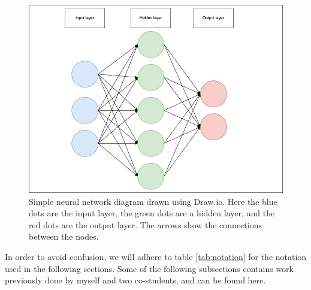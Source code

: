 \begin{figure}[H]
    \includegraphics[width=\linewidth]{Figures/Machinelearning/nn_diagram.jpeg}
    \caption[Simple diagram of a neural network]{Simple neural network diagram drawn using Draw.io. Here the blue dots are the input layer, the green dots are a hidden layer, 
    and the red dots are the output layer. The arrows show the connections between the nodes. }
    \label{fig:nndiagram}
\end{figure}

In order to avoid confusion, we will adhere to table \ref{tab:notation} for the notation used in the following sections.
Some of the following subsections contains work previously done by myself and two co-students, and can be found here\cite{FYSSTK}.

